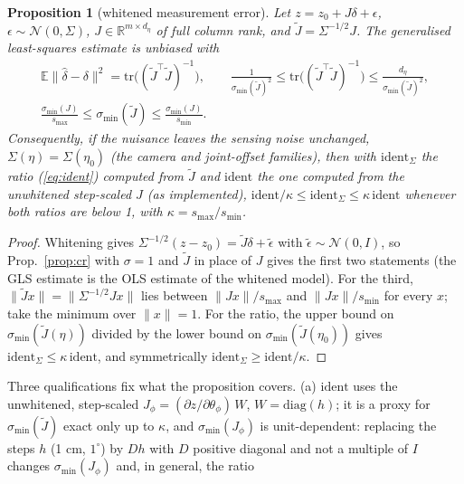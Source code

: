 \documentclass{article}
\newtheorem{proposition}{Proposition}
\newcommand{\ident}{\mathrm{ident}}
\begin{document}
\begin{proposition}[whitened measurement error]
\label{prop:r2cr}
Let $z = z_0 + J\delta + \epsilon$, $\epsilon \sim \mathcal N(0, \Sigma)$, $J \in \mathbb{R}^{m\times d_\eta}$ of full
column rank, and $\tilde J = \Sigma^{-1/2}J$. The generalised least-squares estimate is unbiased with
\begin{equation}
\begin{gathered}
\mathbb{E}\|\hat\delta - \delta\|^2 = \mathrm{tr}\big((\tilde J^\top \tilde J)^{-1}\big), \qquad
\frac{1}{\sigma_{\min}(\tilde J)^2} \le \mathrm{tr}\big((\tilde J^\top\tilde J)^{-1}\big) \le
\frac{d_\eta}{\sigma_{\min}(\tilde J)^2}, \\
\frac{\sigma_{\min}(J)}{s_{\max}} \le \sigma_{\min}(\tilde J) \le \frac{\sigma_{\min}(J)}{s_{\min}} .
\end{gathered}
\label{eq:r2cr}
\end{equation}
Consequently, if the nuisance leaves the sensing noise unchanged, $\Sigma(\eta) = \Sigma(\eta_0)$ (the camera and
joint-offset families), then with $\ident_{\Sigma}$ the ratio (\ref{eq:ident}) computed from $\tilde J$ and $\ident$
the one computed from the unwhitened step-scaled $J$ (as implemented), $\ident / \kappa \le \ident_\Sigma \le
\kappa\,\ident$ whenever both ratios are below 1, with $\kappa = s_{\max}/s_{\min}$.
\end{proposition}
\begin{proof}
Whitening gives $\Sigma^{-1/2}(z - z_0) = \tilde J\delta + \tilde\epsilon$ with $\tilde\epsilon \sim \mathcal N(0, I)$,
so Prop.~\ref{prop:cr} with $\sigma = 1$ and $\tilde J$ in place of $J$ gives the first two statements (the GLS
estimate is the OLS estimate of the whitened model). For the third, $\|\tilde J x\| = \|\Sigma^{-1/2}Jx\|$ lies between
$\|Jx\|/s_{\max}$ and $\|Jx\|/s_{\min}$ for every $x$; take the minimum over $\|x\| = 1$. For the ratio, the upper
bound on $\sigma_{\min}(\tilde J(\eta))$ divided by the lower bound on $\sigma_{\min}(\tilde J(\eta_0))$ gives
$\ident_\Sigma \le \kappa\,\ident$, and symmetrically $\ident_\Sigma \ge \ident/\kappa$.
\end{proof}
Three qualifications fix what the proposition covers. (a) $\ident$ uses the unwhitened, step-scaled $J_\phi =
(\partial z/\partial\theta_\phi)\,W$, $W = \mathrm{diag}(h)$; it is a proxy for $\sigma_{\min}(\tilde J)$ exact only up
to $\kappa$, and $\sigma_{\min}(J_\phi)$ is unit-dependent: replacing the steps $h$ (1 cm, $1^\circ$) by $Dh$ with $D$
positive diagonal and not a multiple of $I$ changes $\sigma_{\min}(J_\phi)$ and, in general, the ratio
\end{document}

